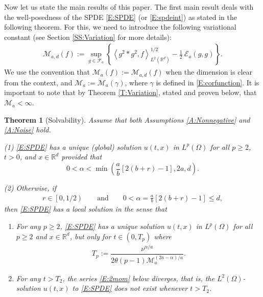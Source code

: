 \documentclass[a4paper,11pt]{article}
\numberwithin{equation}{section}
\numberwithin{equation}{section}
\theoremstyle{plain}
\newtheorem{theorem}{Theorem}[section]
\theoremstyle{definition}
\newcommand{\R}{\mathbb{R}}
\begin{document}
Now let us state the main results of this paper. The first main result deals with the well-posedness
of the SPDE \eqref{E:SPDE} (or \eqref{E:spdeint}) as stated in the following theorem. For this, we
need to introduce the following variational constant (see Section \ref{SS:Variation} for more
details):
\begin{align} \label{E:M1}
  \mathcal{M}_{a,d}\left(f\right) := \sup_{g \in \mathcal{F}_a} \left\{ \left\langle g^2 * g^2, f \right\rangle^{1/2}_{L^2(\R^d)} - \frac{1}{2}\: \mathcal{E}_a(g,g) \right\}.
\end{align}
We use the convention that $\mathcal{M}_{a}\left(f\right) := \mathcal{M}_{a,d}\left(f\right)$ when
the dimension is clear from the context, and $\mathcal{M}_{a}:=\mathcal{M}_{a}(\gamma)$, where
$\gamma$ is defined in \eqref{E:corfunction}. It is important to note that by Theorem \ref{T:Variation}, stated and proven below, that $\mathcal{M}_a < \infty$.

\begin{theorem}[Solvability] \label{T:solvable}
  Assume that both Assumptions \ref{A:Nonnegative} and \ref{A:Noise} hold.

  \noindent (1) \eqref{E:SPDE} has a unique (global) solution $u(t,x)$ in $L^p(\Omega)$ for all $p \ge 2$,
  $t>0$, and $x \in \R^d$ provided that
  \begin{equation}
    \label{E:alpha}
    0< \alpha < \min\left( \frac{a}{b}\left[2(b+r)-1\right], 2a, d \right).
  \end{equation}

  \noindent (2) Otherwise, if
  \begin{align}
    \label{E:critical}
    r\in \left[0,1/2\right) \qquad \text{and} \qquad
    0<\alpha = \frac{a}{b}[2(b+r)-1] \le d,
  \end{align}
  then \eqref{E:SPDE} has a local solution in the sense that
  \begin{enumerate}
    \item[(2-i)] For any $p\ge 2$, \eqref{E:SPDE} has a unique solution $u(t,x)$ in $L^p(\Omega)$ for
      all $p \ge 2$ and $x \in \R^d$, but only for $t\in (0, T_p)$ where
      \begin{align}
        \label{E:Tp}
        T_p := \dfrac{\nu^{\alpha/a}}{2 \theta (p-1) \mathcal{M}_a^{(2a-\alpha)/a}}.
      \end{align}
    \item[(2-ii)] For any $t>T_2$, the series \eqref{E:2mom} below diverges, that is, the
      $L^2(\Omega)$-solution $u(t,x)$ to \eqref{E:SPDE} does not exist whenever $t>T_2$.
  \end{enumerate}
\end{theorem}
\end{document}
